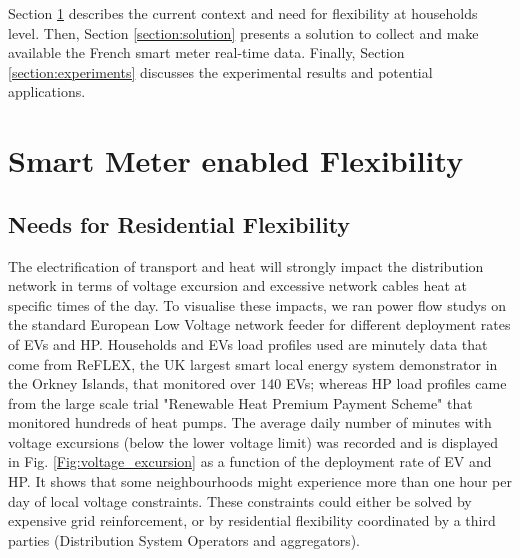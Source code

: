 \documentclass[conference]{IEEEtran}
\begin{document}
	
	Section \ref{section:needs} describes the current context and need for flexibility at households level. Then, Section \ref{section:solution} presents a solution to collect and make available the French smart meter real-time data.
	Finally, Section \ref{section:experiments} discusses the experimental results and potential applications.
	
	\section{Smart Meter enabled Flexibility}
	\label{section:needs}
	
	\subsection{Needs for Residential Flexibility}
	The electrification of transport and heat will strongly impact the distribution network
	in terms of voltage excursion and excessive network cables heat at specific times of the day. To visualise these impacts, we ran power flow studys on the standard European Low Voltage network feeder \cite{IEEE:PESTestFeeder} for different deployment rates of EVs and HP.
	 Households and EVs load profiles used are minutely data that come from ReFLEX, the UK  largest smart local energy system demonstrator in the Orkney Islands, 
	 that monitored over 140 EVs; whereas HP load profiles came from the large scale trial "Renewable Heat Premium Payment Scheme" \cite{RHPP} that monitored hundreds of heat pumps.
The average daily number of minutes with voltage excursions (below the lower voltage limit) was recorded and is displayed in Fig. \ref{Fig:voltage_excursion} as a function of the deployment rate of EV and HP. It shows that some neighbourhoods
might experience more than one hour per day of local voltage constraints. These constraints could either be solved by expensive grid reinforcement, or by residential flexibility coordinated by a third parties (Distribution System Operators and aggregators). 
	
\end{document}
